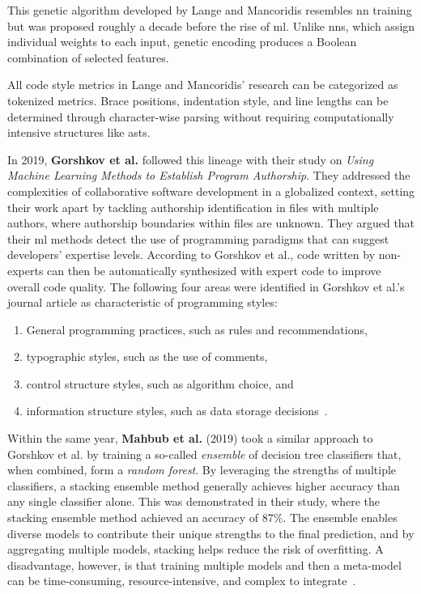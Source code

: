 This genetic algorithm developed by Lange and Mancoridis resembles \ac{nn} training but was proposed roughly a decade before the rise of \ac{ml}.
Unlike \acp{nn}, which assign individual weights to each input, genetic encoding produces a Boolean combination of selected features.

All code style metrics in Lange and Mancoridis' research can be categorized as tokenized metrics.
Brace positions, indentation style, and line lengths can be determined through character-wise parsing without requiring computationally intensive structures like \acp{ast}.

In 2019, \textbf{Gorshkov et al.} followed this lineage with their study on \textit{Using Machine Learning Methods to Establish Program Authorship}.
They addressed the complexities of collaborative software development in a globalized context, setting their work apart by tackling authorship identification in files with multiple authors, where authorship boundaries within files are unknown.
They argued that their \ac{ml} methods detect the use of programming paradigms that can suggest developers' expertise levels.
According to Gorshkov et al., code written by non-experts can then be automatically synthesized with expert code to improve overall code quality.
The following four areas were identified in Gorshkov et al.'s journal article as characteristic of programming styles:

\begin{enumerate}
    \item General programming practices, such as rules and recommendations,
    \item typographic styles, such as the use of comments,
    \item control structure styles, such as algorithm choice, and
    \item information structure styles, such as data storage decisions~\cite{Gorshkov2019}.
\end{enumerate}

Within the same year, \textbf{Mahbub et al.} (2019) took a similar approach to Gorshkov et al. by training a so-called \textit{ensemble} of decision tree classifiers that, when combined, form a \textit{random forest}.
By leveraging the strengths of multiple classifiers, a stacking ensemble method generally achieves higher accuracy than any single classifier alone.
This was demonstrated in their study, where the stacking ensemble method achieved an accuracy of 87\%.
The ensemble enables diverse models to contribute their unique strengths to the final prediction, and by aggregating multiple models, stacking helps reduce the risk of overfitting.
A disadvantage, however, is that training multiple models and then a meta-model can be time-consuming, resource-intensive, and complex to integrate~\cite{Mahbub2019}.

